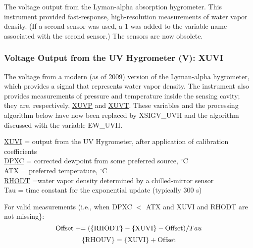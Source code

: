 \documentclass[
]{book}
\begin{document}
The voltage output from the Lyman-alpha absorption hygrometer. This instrument provided fast-response, high-resolution measurements of water vapor density. (If a second sensor was used, a 1 was added to the variable name associated with the second sensor.) The sensors are now obsolete.

\hypertarget{xuvi}{%
\subsubsection*{Voltage Output from the UV Hygrometer (V): XUVI}\label{xuvi}}

The voltage from a modern (as of 2009) version of the Lyman-alpha hygrometer, which provides a signal that represents water vapor density. The instrument also provides measurements of pressure and temperature inside the sensing cavity; they are, respectively, \uline{XUVP} and \uline{XUVT}. These variables and the processing algorithm below have now been replaced by XSIGV\_UVH and the algorithm discussed with the variable EW\_UVH.

\newcommand{\pluseq}{\mathrel{+}\mathrel{\mkern-1mu}=}

\protect\hyperlink{xuvi}{XUVI} = output from the UV Hygrometer, after application of calibration
coefficients\\
\href{./4-the-state-of-the-atmosphere.html\#dewpt-corrected}{DPXC} = corrected dewpoint from some preferred source,
\(^{\circ}\)C\\
\href{./4-the-state-of-the-atmosphere.html\#ambient-t}{ATX} = preferred temperature, \(^{\circ}\)C\\
\href{./4-the-state-of-the-atmosphere.html\#rho}{RHODT} =water vapor density determined by a chilled-mirror
sensor\\
Tau = time constant for the exponential update (typically 300 s)

For valid measurements (i.e., when DPXC \(<\) ATX and XUVI and RHODT are not missing\}:\\
\begin{equation}
\mathrm{Offset}\mathrel{+}\mathrel{\mkern-1mu}=(\mathrm{\{RHODT\}-\{XUVI\}-Offset})/Tau
\label{eq:RHOUVbox1}
\end{equation}
\begin{equation}
\mathrm{\{RHOUV\} = \{XUVI\} + Offset}
\label{eq:RHOUBbox2}
\end{equation}
\end{document}
